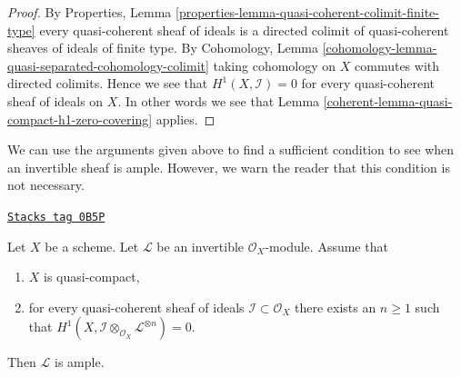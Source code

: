 \begin{proof}

By
Properties, Lemma \ref{properties-lemma-quasi-coherent-colimit-finite-type}
every quasi-coherent sheaf of ideals is a directed colimit of
quasi-coherent sheaves of ideals of finite type.
By Cohomology, Lemma \ref{cohomology-lemma-quasi-separated-cohomology-colimit}
taking cohomology on $X$ commutes with directed colimits.
Hence we see that $H^1(X, \mathcal{I}) = 0$
for every quasi-coherent sheaf of ideals on $X$. In other words
we see that Lemma \ref{coherent-lemma-quasi-compact-h1-zero-covering} applies.
\end{proof}

We can use the arguments given above to find a sufficient condition to
see when an invertible sheaf is ample. However, we warn the reader that
this condition is not necessary.

\begin{lemma}
\label{coherent-lemma-quasi-compact-h1-zero-invertible}
\href{https://stacks.math.columbia.edu/tag/0B5P}{\texttt{Stacks tag 0B5P}}

Let $X$ be a scheme. Let $\mathcal{L}$ be an invertible $\mathcal{O}_X$-module.
Assume that
\begin{enumerate}
\item $X$ is quasi-compact,
\item for every quasi-coherent sheaf of ideals
$\mathcal{I} \subset \mathcal{O}_X$
there exists an $n \geq 1$ such that
$H^1(X, \mathcal{I} \otimes_{\mathcal{O}_X} \mathcal{L}^{\otimes n}) = 0$.
\end{enumerate}
Then $\mathcal{L}$ is ample.
\end{lemma}

